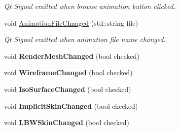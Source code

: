 \begin{DoxyCompactItemize}
\begin{DoxyCompactList}\small\item\em Qt Signal emitted when browse animation button clicked. \end{DoxyCompactList}\item 
void \hyperlink{classImplicitSkinSettings_abc1b379dc1c51a8ca631edda32706df3}{Animation\+File\+Chnaged} (std\+::string file)\hypertarget{classImplicitSkinSettings_abc1b379dc1c51a8ca631edda32706df3}{}\label{classImplicitSkinSettings_abc1b379dc1c51a8ca631edda32706df3}

\begin{DoxyCompactList}\small\item\em Qt Signal emitted when animation file name changed. \end{DoxyCompactList}\item 
void {\bfseries Render\+Mesh\+Changed} (bool checked)\hypertarget{classImplicitSkinSettings_aecbd4de73c7fe10b4bb60896c3d67c25}{}\label{classImplicitSkinSettings_aecbd4de73c7fe10b4bb60896c3d67c25}

\item 
void {\bfseries Wireframe\+Changed} (bool checked)\hypertarget{classImplicitSkinSettings_ad361ec65cf91284de54a5563ec7aadad}{}\label{classImplicitSkinSettings_ad361ec65cf91284de54a5563ec7aadad}

\item 
void {\bfseries Iso\+Surface\+Changed} (bool checked)\hypertarget{classImplicitSkinSettings_a745a1b43caec64c5f5297511db6c4c45}{}\label{classImplicitSkinSettings_a745a1b43caec64c5f5297511db6c4c45}

\item 
void {\bfseries Implicit\+Skin\+Changed} (bool checked)\hypertarget{classImplicitSkinSettings_a0ea98811435c2c1f69d01d15f0df81e7}{}\label{classImplicitSkinSettings_a0ea98811435c2c1f69d01d15f0df81e7}

\item 
void {\bfseries L\+B\+W\+Skin\+Changed} (bool checked)\hypertarget{classImplicitSkinSettings_a4984d2e43a23a103f1401d2c8a62b159}{}\label{classImplicitSkinSettings_a4984d2e43a23a103f1401d2c8a62b159}

\end{DoxyCompactItemize}
